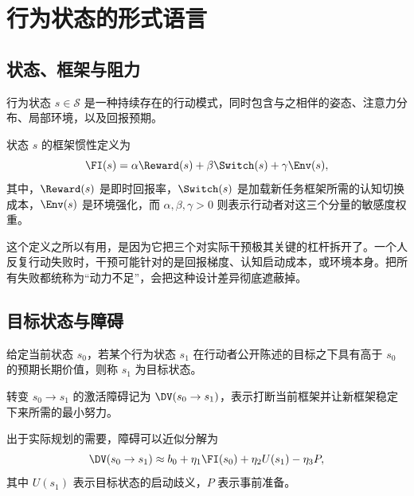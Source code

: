\chapter{行为状态的形式语言}
\label{ch:formal-language}

\section{状态、框架与阻力}

\begin{definition}[行为状态]
行为状态 $s \in \mathcal{S}$ 是一种持续存在的行动模式，同时包含与之相伴的姿态、注意力分布、局部环境，以及回报预期。
\end{definition}

\begin{definition}[框架惯性]
状态 $s$ 的框架惯性定义为
\[
  \FI(s) = \alpha \Reward(s) + \beta \Switch(s) + \gamma \Env(s),
\]
其中，$\Reward(s)$ 是即时回报率，$\Switch(s)$ 是加载新任务框架所需的认知切换成本，$\Env(s)$ 是环境强化，而 $\alpha, \beta, \gamma > 0$ 则表示行动者对这三个分量的敏感度权重。
\end{definition}

\begin{remark}
这个定义之所以有用，是因为它把三个对实际干预极其关键的杠杆拆开了。一个人反复行动失败时，干预可能针对的是回报梯度、认知启动成本，或环境本身。把所有失败都统称为“动力不足”，会把这种设计差异彻底遮蔽掉。
\end{remark}

\section{目标状态与障碍}

\begin{definition}[目标状态]
给定当前状态 $s_0$，若某个行为状态 $s_1$ 在行动者公开陈述的目标之下具有高于 $s_0$ 的预期长期价值，则称 $s_1$ 为目标状态。
\end{definition}

\begin{definition}[激活障碍]
转变 $s_0 \to s_1$ 的激活障碍记为 $\DV(s_0 \to s_1)$，表示打断当前框架并让新框架稳定下来所需的最小努力。
\end{definition}

\begin{proposition}[障碍分解]
出于实际规划的需要，障碍可以近似分解为
\[
  \DV(s_0 \to s_1) \approx b_0 + \eta_1 \FI(s_0) + \eta_2 U(s_1) - \eta_3 P,
\]
其中 $U(s_1)$ 表示目标状态的启动歧义，$P$ 表示事前准备。
\end{proposition}

